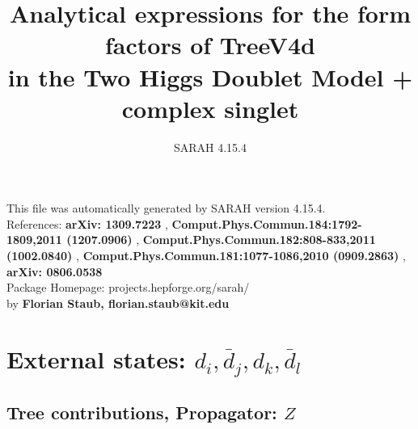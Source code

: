\documentclass[A4,landscape]{article}
\begin{document}
\title{Analytical expressions for the form factors of TreeV4d\\ in the Two Higgs Doublet Model + complex singlet } 
 \author{SARAH 4.15.4} 
 \maketitle 
 \vspace{10cm} 
This file was automatically generated by SARAH version 4.15.4.  \\ 
References: {\bf arXiv: 1309.7223 }, {\bf Comput.Phys.Commun.184:1792-1809,2011 (1207.0906) }, {\bf Comput.Phys.Commun.182:808-833,2011 (1002.0840) }, {\bf Comput.Phys.Commun.181:1077-1086,2010 (0909.2863) }, {\bf arXiv: 0806.0538 } \\ 
Package Homepage: projects.hepforge.org/sarah/ \\ 
by {\bf Florian Staub, florian.staub@kit.edu} 
 \pagebreak 
 \tableofcontents 
 \pagebreak 
\section{External states: ${d_{{i}}, \bar{d}_{{j}}, d_{{k}}, \bar{d}_{{l}}}$} 
\subsection{Tree contributions, Propagator: $Z$} 
\end{document}
